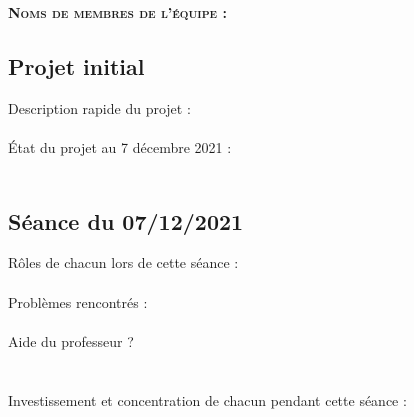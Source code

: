 \documentclass[a4paper,12pt,french]{article}
\begin{document}
\textbf{\textsc{Noms de membres de l'équipe :}}\\



\subsection*{Projet initial}

Description rapide du projet :\\

\\

\'Etat du projet au 7 décembre 2021 :\\

\\

\subsection*{Séance du 07/12/2021}

Rôles de chacun lors de cette séance :\\

\\

Problèmes rencontrés :\\

\\

Aide du professeur ?\\

\\

\ligne\\

Investissement et concentration de chacun pendant cette séance :\\

\\
\end{document}
